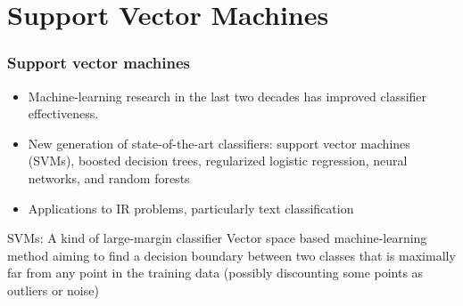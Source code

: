 \documentclass[compress]{beamer}
\newcommand{\1}{\mathbf{1}}
\begin{document}
\section{Support Vector Machines}
\begin{frame}
\frametitle{Support vector machines}
\begin{itemize}
\item Machine-learning research in the last two decades has improved classifier effectiveness.
\item New generation of state-of-the-art classifiers: support
vector machines (SVMs), boosted decision trees, regularized logistic
regression, neural networks, and random forests
\item Applications to IR problems, particularly text classification
\end{itemize}
\begin{block}{SVMs: A kind
of large-margin classifier}
Vector space based machine-learning method aiming to find a decision boundary between two classes that is
maximally far from any point
in the training data (possibly discounting some points as outliers or noise)
\end{block}

\end{frame}
\end{document}
